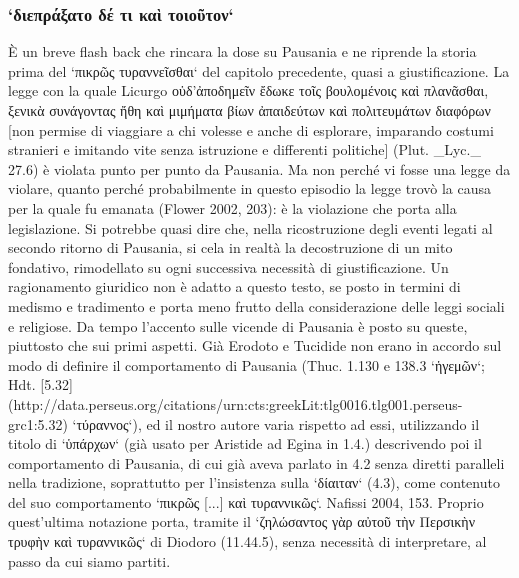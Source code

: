             \subsubsection{`διεπράξατο δέ τι καὶ τοιοῦτον`}
            È un breve flash back che rincara la dose su Pausania  e ne riprende la storia prima del `πικρῶς τυραννεῖσθαι` del capitolo precedente, quasi a giustificazione. La legge con la quale Licurgo   \textgreek{οὑδ'ἀποδημεῖν ἔδωκε τοῖς βουλομένοις καὶ πλανᾶσθαι, ξενικὰ συνάγοντας ἤθη καὶ μιμήματα βίων ἀπαιδεύτων καὶ πολιτευμάτων διαφόρων} [non permise di viaggiare a chi volesse e anche di esplorare, imparando costumi stranieri e imitando vite senza istruzione e differenti politiche] (Plut. _Lyc._ 27.6)  è violata punto per punto da Pausania. Ma non perché vi fosse una legge da violare, quanto perché probabilmente in questo episodio la legge trovò la causa per la quale fu emanata (Flower 2002, 203): è la violazione che porta alla legislazione. Si potrebbe quasi dire che, nella ricostruzione degli eventi legati al secondo ritorno di Pausania, si cela in realtà la decostruzione di un mito fondativo, rimodellato su ogni successiva necessità di giustificazione. Un ragionamento giuridico non è adatto a questo testo, se posto in termini di medismo e tradimento e porta meno frutto della considerazione delle leggi sociali e religiose. Da tempo l'accento sulle vicende di Pausania  è posto su queste, piuttosto che sui primi aspetti. Già Erodoto e Tucidide non erano in accordo sul modo di definire il comportamento di Pausania  (Thuc. 1.130 e 138.3 `ἡγεμῶν`; Hdt. [5.32](http://data.perseus.org/citations/urn:cts:greekLit:tlg0016.tlg001.perseus-grc1:5.32) `τύραννος`), ed il nostro autore varia rispetto ad essi, utilizzando il titolo di `ὑπάρχων` (già usato per Aristide ad Egina in 1.4.) descrivendo poi il comportamento di Pausania, di cui già aveva parlato in 4.2 senza diretti paralleli nella tradizione, soprattutto per l'insistenza sulla  `δίαιταν` (4.3), come contenuto del suo comportamento `πικρῶς [...] καὶ τυραννικῶς`. Nafissi 2004, 153. Proprio quest'ultima notazione porta, tramite il `ζηλώσαντος γὰρ αὐτοῦ τὴν Περσικὴν τρυφὴν καὶ τυραννικῶς` di  Diodoro (11.44.5), senza necessità di interpretare, al passo da cui siamo partiti. 
